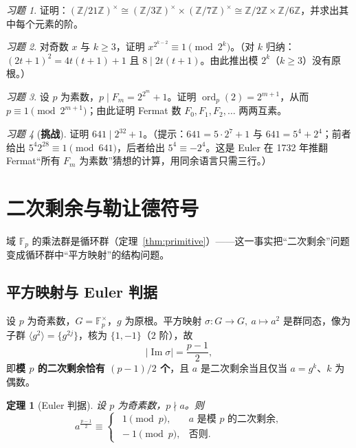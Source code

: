 \documentclass[a4paper,11pt]{ctexart}
\numberwithin{equation}{section}
\theoremstyle{plain}
\newtheorem{theorem}{定理}[section]
\theoremstyle{definition}
\theoremstyle{remark}
\newtheorem{exercise}{习题}[section]
\newcommand{\Z}{\mathbb{Z}}
\newcommand{\F}{\mathbb{F}}
\DeclareMathOperator{\ord}{ord}
\DeclareMathOperator{\Img}{Im}
\begin{document}
\begin{exercise}\label{ex:5-4}
证明：$(\Z/21\Z)^{\times}\cong(\Z/3\Z)^{\times}\times(\Z/7\Z)^{\times}\cong \Z/2\Z\times\Z/6\Z$，并求出其中每个元素的阶。
\end{exercise}

\begin{exercise}\label{ex:5-5}
对奇数 $x$ 与 $k\ge3$，证明 $x^{2^{k-2}}\equiv 1\pmod{2^k}$。（对 $k$ 归纳：$(2t+1)^2=4t(t+1)+1$ 且 $8\mid 2t(t+1)$。由此推出模 $2^k$（$k\ge3$）没有原根。）
\end{exercise}

\begin{exercise}\label{ex:5-6}
设 $p$ 为素数，$p\mid F_m=2^{2^m}+1$。证明 $\ord_p(2)=2^{m+1}$，从而 $p\equiv1\pmod{2^{m+1}}$；由此证明 Fermat 数 $F_0,F_1,F_2,\dots$ 两两互素。
\end{exercise}

\begin{exercise}[\textbf{挑战}]\label{ex:5-7}
证明 $641\mid 2^{32}+1$。（提示：$641=5\cdot2^7+1$ 与 $641=5^4+2^4$；前者给出 $5^4 2^{28}\equiv 1\pmod{641}$，后者给出 $5^4\equiv-2^4$。这是 Euler 在 1732 年推翻 Fermat“所有 $F_m$ 为素数”猜想的计算，用同余语言只需三行。）
\end{exercise}

\newpage

\section{二次剩余与勒让德符号}\label{sec:QR}

域 $\F_p$ 的乘法群是循环群（定理~\ref{thm:primitive}）——这一事实把“二次剩余”问题变成循环群中“平方映射”的结构问题。

\subsection{平方映射与 Euler 判据}

设 $p$ 为奇素数，$G=\F_p^{\times}$，$g$ 为原根。平方映射 $\sigma\colon G\to G,\ a\mapsto a^2$ 是群同态，像为子群 $\langle g^2\rangle=\{g^{2j}\}$，核为 $\{1,-1\}$（$2$ 阶），故
\[
|\Img\sigma|=\frac{p-1}{2},
\]
即\textbf{模 $p$ 的二次剩余恰有 $(p-1)/2$ 个}，且 $a$ 是二次剩余当且仅当 $a=g^{k}$、$k$ 为偶数。

\begin{theorem}[Euler 判据]\label{thm:Eulercrit}
设 $p$ 为奇素数，$p\nmid a$。则
\[
a^{\frac{p-1}{2}}\equiv
\begin{cases}
\ \ 1 \pmod p, & a \text{ 是模 } p \text{ 的二次剩余},\\
\ -1 \pmod p, & \text{否则}.
\end{cases}
\]
\end{theorem}
\end{document}
